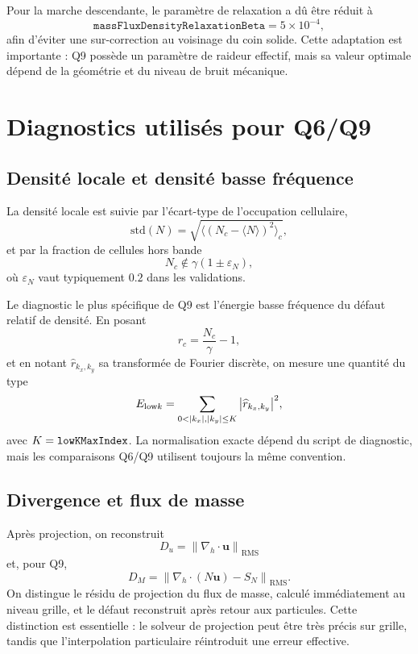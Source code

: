 \documentclass[11pt,a4paper]{article}
\begin{document}
Pour la marche descendante, le paramètre de relaxation a dû être réduit à
\begin{equation}
  \texttt{massFluxDensityRelaxationBeta}=5\times10^{-4},
\end{equation}
afin d'éviter une sur-correction au voisinage du coin solide. Cette adaptation est importante : Q9 possède un paramètre de raideur effectif, mais sa valeur optimale dépend de la géométrie et du niveau de bruit mécanique.

\section{Diagnostics utilisés pour Q6/Q9}

\subsection{Densité locale et densité basse fréquence}

La densité locale est suivie par l'écart-type de l'occupation cellulaire,
\begin{equation}
  \mathrm{std}(N)=\sqrt{\langle (N_c-\langle N\rangle)^2\rangle_c},
\end{equation}
et par la fraction de cellules hors bande
\begin{equation}
  N_c\notin \gamma(1\pm \varepsilon_N),
\end{equation}
où $\varepsilon_N$ vaut typiquement $0.2$ dans les validations.

Le diagnostic le plus spécifique de Q9 est l'énergie basse fréquence du défaut relatif de densité. En posant
\begin{equation}
  r_c = \frac{N_c}{\gamma}-1,
\end{equation}
et en notant $\widehat r_{k_x,k_y}$ sa transformée de Fourier discrète, on mesure une quantité du type
\begin{equation}
  E_{\mathrm{low}k}=\sum_{0<|k_x|,|k_y|\le K}\abs{\widehat r_{k_x,k_y}}^2,
\end{equation}
avec $K=\verb|lowKMaxIndex|$. La normalisation exacte dépend du script de diagnostic, mais les comparaisons Q6/Q9 utilisent toujours la même convention.

\subsection{Divergence et flux de masse}

Après projection, on reconstruit
\begin{equation}
  D_u = \left\|\nabla_h\cdot\bm{u}\right\|_{\mathrm{RMS}}
\end{equation}
et, pour Q9,
\begin{equation}
  D_M = \left\|\nabla_h\cdot(N\bm{u})-S_N\right\|_{\mathrm{RMS}}.
\end{equation}
On distingue le résidu de projection du flux de masse, calculé immédiatement au niveau grille, et le défaut reconstruit après retour aux particules. Cette distinction est essentielle : le solveur de projection peut être très précis sur grille, tandis que l'interpolation particulaire réintroduit une erreur effective.
\end{document}
